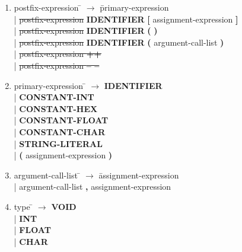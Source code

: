 \begin{enumerate}
\item \begin{tabbing} postfix-expression \= $\rightarrow$ \= primary-expression \\
	\> \hspace*{0.05cm} | \> \sout{postfix-expression} \textbf{IDENTIFIER} \textbf{[} assignment-expression \textbf{]} \\
	\> \hspace*{0.05cm} | \> \sout{postfix-expression} \textbf{IDENTIFIER} \textbf{(} \textbf{)} \\
	\> \hspace*{0.05cm} | \> \sout{postfix-expression} \textbf{IDENTIFIER} \textbf{(} argument-call-list \textbf{)} \\
	\> \hspace*{0.05cm} | \> \sout{postfix-expression \textbf{++}} \\
	\> \hspace*{0.05cm} | \> \sout{postfix-expression \textbf{-- --}} \\
\end{tabbing}

\item \begin{tabbing} primary-expression \= $\rightarrow$ \= \textbf{IDENTIFIER} \\
	\> \hspace*{0.05cm} | \> \textbf{CONSTANT-INT} \\
	\> \hspace*{0.05cm} | \> \textbf{CONSTANT-HEX} \\
	\> \hspace*{0.05cm} | \> \textbf{CONSTANT-FLOAT} \\
	\> \hspace*{0.05cm} | \> \textbf{CONSTANT-CHAR} \\
	\> \hspace*{0.05cm} | \> \textbf{STRING-LITERAL} \\
	\> \hspace*{0.05cm} | \> \textbf{(} assignment-expression \textbf{)} \\
\end{tabbing}

\item \begin{tabbing} argument-call-list \= $\rightarrow$ \= assignment-expression \\
	\> \hspace*{0.05cm} | \> argument-call-list \textbf{,} assignment-expression
\end{tabbing}

\item \begin{tabbing} type \= $\rightarrow$ \= \textbf{VOID} \\
	\> \hspace*{0.05cm} | \> \textbf{INT} \\
	\> \hspace*{0.05cm} | \> \textbf{FLOAT} \\
	\> \hspace*{0.05cm} | \> \textbf{CHAR}
\end{tabbing}

\end{enumerate}
